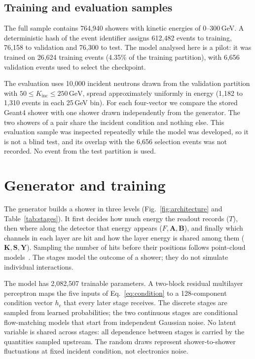 \documentclass[11pt]{article}
\newcommand{\GeV}{\,\mathrm{GeV}}
\newcommand{\Kinc}{K_{\mathrm{inc}}}
\newcommand{\Y}{\mathbf{Y}}
\begin{document}
\subsection{Training and evaluation samples}

The full sample contains 764,940 showers with kinetic energies of 0--300\,GeV. A deterministic hash of the event identifier assigns 612,482 events to training, 76,158 to validation and 76,300 to test. The model analysed here is a pilot: it was trained on 26,624 training events (4.35\% of the training partition), with 6,656 validation events used to select the checkpoint.

The evaluation uses 10,000 incident neutrons drawn from the validation partition with $50\leq\Kinc\leq250\GeV$, spread approximately uniformly in energy (1,182 to 1,310 events in each 25\,GeV bin). For each four-vector we compare the stored Geant4 shower with one shower drawn independently from the generator. The two showers of a pair share the incident condition and nothing else. This evaluation sample was inspected repeatedly while the model was developed, so it is not a blind test, and its overlap with the 6,656 selection events was not recorded. No event from the test partition is used.

\section{Generator and training}
\label{sec:model}

The generator builds a shower in three levels (Fig.~\ref{fig:architecture} and Table~\ref{tab:stages}). It first decides how much energy the readout records ($T$), then where along the detector that energy appears ($F,\mathbf A,\mathbf B$), and finally which channels in each layer are hit and how the layer energy is shared among them ($\mathbf K,\mathbf S,\Y$). Sampling the number of hits before their positions follows point-cloud models~\cite{caloclouds2,calopointflow}. The stages model the outcome of a shower; they do not simulate individual interactions.

The model has 2,082,507 trainable parameters. A two-block residual multilayer perceptron maps the five inputs of Eq.~\eqref{eq:condition} to a 128-component condition vector $h_c$ that every later stage receives. The discrete stages are sampled from learned probabilities; the two continuous stages are conditional flow-matching models that start from independent Gaussian noise. No latent variable is shared across stages: all dependence between stages is carried by the quantities sampled upstream. The random draws represent shower-to-shower fluctuations at fixed incident condition, not electronics noise.
\end{document}
